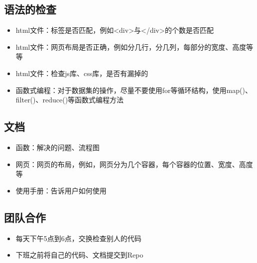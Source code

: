 \subsection{语法的检查}

\begin{itemize}
  \item html文件：标签是否匹配，例如<div>与</div>的个数是否匹配
  \item html文件：网页布局是否正确，例如分几行，分几列，每部分的宽度、高度等等
  \item html文件：检查js库、css库，是否有漏掉的
  \item 函数式编程：对于数据集的操作，尽量不要使用for等循环结构，使用map()、filter()、reduce()等函数式编程方法
\end{itemize}


\subsection{文档}

\begin{itemize}
  \item 函数：解决的问题、流程图
  \item 网页：网页的布局，例如，网页分为几个容器，每个容器的位置、宽度、高度等
  \item 使用手册：告诉用户如何使用
\end{itemize}

\subsection{团队合作}

\begin{itemize}
  \item 每天下午5点到6点，交换检查别人的代码
  \item 下班之前将自己的代码、文档提交到Repo
\end{itemize}
